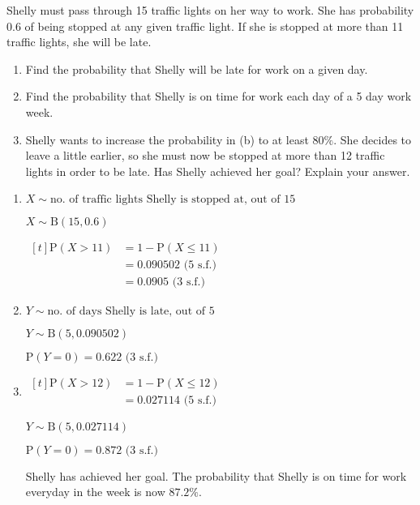 \documentclass[11pt,a4paper]{book}
\begin{document}
\begin{example}

Shelly must pass through 15 traffic lights on her way to work. She
has probability $0.6$ of being stopped at any given traffic light.
If she is stopped at more than 11 traffic lights, she will be late.

\begin{enumerate}[label=(\alph*)]

\item  Find the probability that Shelly will be late for work on
a given day.

\item  Find the probability that Shelly is on time for work each
day of a 5 day work week.

\item  Shelly wants to increase the probability in (b) to at least
$80\%$. She decides to leave a little earlier, so she must now be
stopped at more than 12 traffic lights in order to be late. Has Shelly
achieved her goal? Explain your answer.

\end{enumerate}

\Solution

\begin{enumerate}[label=(\alph*)]

\item  $X\sim\text{no. of traffic lights Shelly is stopped at, out of 15}$

$X\sim\text{B}\left(15,0.6\right)$

$
\begin{aligned}[t]
\text{P}\left(X>11\right) & =1-\text{P}\left(X\leq11\right)\\
 & =0.090502\text{ (5 s.f.)}\\
 & =0.0905\text{ (3 s.f.)}
\end{aligned}
$

\item  $Y\sim\text{no. of days Shelly is late, out of 5}$

$Y\sim\text{B}\left(5,0.090502\right)$

$\text{P}\left(Y=0\right)=0.622\text{ (3 s.f.)}$

\item  
$
\begin{aligned}[t]
\text{P}\left(X>12\right) & =1-\text{P}\left(X\leq12\right)\\
 & =0.027114\text{ (5 s.f.)}
\end{aligned}
$

$Y\sim\text{B}\left(5,0.027114\right)$

$\text{P}\left(Y=0\right)=0.872\text{ (3 s.f.)}$


Shelly has achieved her goal. The probability that Shelly is on time
for work everyday in the week is now $87.2\%$.


\end{enumerate}

\end{example}
\end{document}
